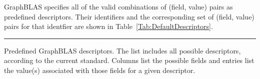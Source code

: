 GraphBLAS specifies all of the valid combinations of (field, value) pairs as 
predefined descriptors. Their identifiers and the corresponding set of 
(field, value) pairs for that identfier are shown in 
Table~\ref{Tab:DefaultDescriptors}.

\newcommand{\grboutp}{{\sf GrB\_OUTP}}
\newcommand{\grbmask}{{\sf GrB\_MASK}}
\newcommand{\grbinp}[1]{{\sf GrB\_INP#1}}
\newcommand{\grbreplace}{{\sf GrB\_REPLACE}}
\newcommand{\grbstructure}{{\sf GrB\_STRUCTURE}}
\newcommand{\grbscmp}{{\sf GrB\_COMP}}

\newcommand{\grbrepl}{{\sf GrB\_REPLACE}}
\newcommand{\grbstrc}{{\sf GrB\_STRUCTURE}}
\newcommand{\grbcomp}{{\sf GrB\_COMP}}
\newcommand{\grbtran}{{\sf GrB\_TRAN}}

\begin{table}[htbp]
    \hrule
    \begin{center}
    \caption{Predefined GraphBLAS descriptors. The list includes
    all possible descriptors, according to the current standard.  Columns list the
    possible fields and entries list the value(s) associated with those fields for
    a given descriptor.}
    \label{Tab:DefaultDescriptors}
~\\
    \begin{small}


\end{small}
\end{center}
\end{table}
